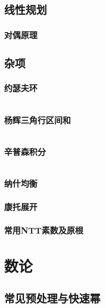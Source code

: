 \documentclass[a4paper, twoside]{article}
\begin{document}
\begin{multicols}{2}
			\subsection{线性规划}
				\subsubsection{对偶原理}
					
				
			\subsection{杂项}
				\subsubsection{约瑟夫环}
					\inputminted{cpp}{../src-midori/math/约瑟夫环.cpp}
				\subsubsection{杨辉三角行区间和}
					\inputminted{cpp}{../src-midori/math/杨辉三角行区间和.cpp}
				\subsubsection{辛普森积分}
					\inputminted{cpp}{../src-midori/math/simpson.cpp}
				\subsubsection{纳什均衡}
					
				\subsubsection{康托展开}
					
				\subsubsection{常用NTT素数及原根}
					

		\newpage
		\section{数论}

			\subsection{常见预处理与快速幂}
				\inputminted{cpp}{../src-midori/number/常见预处理与快速幂.cpp}


\end{multicols}
\end{document}
